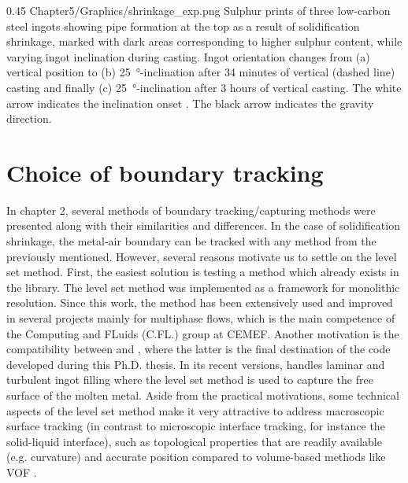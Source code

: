 \begin{figureth}
{0.45}
{Chapter5/Graphics/shrinkage_exp.png}
{Sulphur prints of three low-carbon steel ingots showing pipe formation at the top as a result 
of solidification shrinkage, marked with dark areas corresponding to higher sulphur content, while varying ingot inclination during casting.
Ingot orientation changes from (a) vertical position to (b) \SI{25}{\degree}-inclination after 34 minutes of vertical (dashed line) casting and finally (c) \SI{25}{\degree}-inclination after 3 hours of vertical casting. The white arrow indicates the inclination onset \citep{onodera_effect_1959}. The black arrow indicates the gravity direction.}
\label{fig:shrinkage_exp}
\end{figureth}
%
%
\section{Choice of boundary tracking}
In chapter 2, several methods of boundary tracking/capturing methods were presented 
along with their similarities and differences. In the case of solidification shrinkage,
the metal-air boundary can be tracked with any method from the previously mentioned.
However, several reasons motivate us to settle on the level set method. 
First, the easiest solution is testing a method which already exists in the \cimlib library.
The level set method was implemented as a framework for monolithic resolution. Since this work,
the method has been extensively used and improved in several projects mainly for multiphase flows, which is the 
main competence of the Computing and FLuids (C.FL.) group at CEMEF. Another motivation is the compatibility
between \cimlib and \thercast, where the latter is the final destination of the code developed during this Ph.D. thesis.
In its recent versions, \thercast handles laminar and turbulent ingot filling where the level set method is used 
to capture the free surface of the molten metal. Aside from the practical motivations, some technical aspects of the level
set method make it very attractive to address macroscopic surface tracking 
(in contrast to microscopic interface tracking, for instance the solid-liquid interface), 
such as topological properties that are readily available (e.g. curvature)
and accurate position compared to volume-based methods like VOF \citep{sethian_level_1999}.
%
